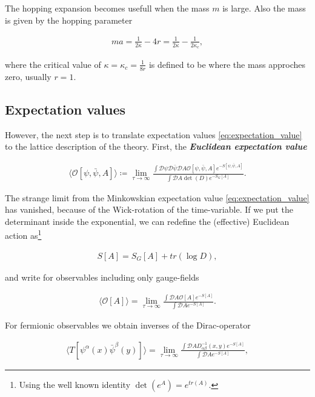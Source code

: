 \documentclass{article}
\theoremstyle{plain} %
\theoremstyle{convention} %
\theoremstyle{remark} %
\def\df#1{\textbf{\textit{#1}}}
\numberwithin{equation}{section}
\begin{document}
The hopping expansion becomes usefull when the mass $m$ is large. Also the mass is given by the hopping parameter

\begin{align*}
    m a = \frac{1}{2 \kappa} - 4r = \frac{1}{2 \kappa} - \frac{1}{2 \kappa_c},
\end{align*}

where the critical value of $\kappa = \kappa_c = \frac{1}{8r}$ is defined to be where the mass approches zero, usually $r=1$.

\subsection{Expectation values}

However, the next step is to translate expectation values \eqref{eq:expectation_value} to the lattice description of the theory. First, the \df{Euclidean expectation value}

\begin{align*}
    \langle \mathcal{O}[\psi, \bar{\psi}, A] \rangle \coloneqq \lim_{\tau \to \infty} \frac{ \int \mathcal{D} \psi \mathcal{D} \bar{\psi} \mathcal{D} A \mathcal{O}[\psi, \bar{\psi}, A] e^{-S[\psi,\bar{\psi},A]} }{ \int \mathcal{D} A \det(D) e^{-S_G[A]} }.
\end{align*}

The strange limit from the Minkowskian expectation value \eqref{eq:expectation_value} has vanished, because of the Wick-rotation of the time-variable. If we put the determinant inside the exponential, we can redefine the (effective) Euclidean action as\footnote{Using the well known identity $\det(e^A) = e^{tr(A)}$.}

\begin{align}
    S[A] = S_G[A] + tr(\log D), \label{eq:eucl_action}
\end{align}

and write for observables including only gauge-fields

\begin{align*}
    \langle \mathcal{O}[A] \rangle = \lim_{\tau \to \infty} \frac{ \int \mathcal{D} A \mathcal{O}[A] e^{-S[A]} }{ \int \mathcal{D} A e^{-S[A]} }.
\end{align*}

For fermionic observables we obtain inverses of the Dirac-operator

\begin{align*}
    \langle T[\psi^{\alpha}(x) \bar{\psi}^{\beta}(y)] \rangle = \lim_{\tau \to \infty} \frac{ \int \mathcal{D} A D_{\alpha \beta}^{-1}(x,y) e^{-S[A]} }{ \int \mathcal{D} A e^{-S[A]} },
\end{align*}
\end{document}
